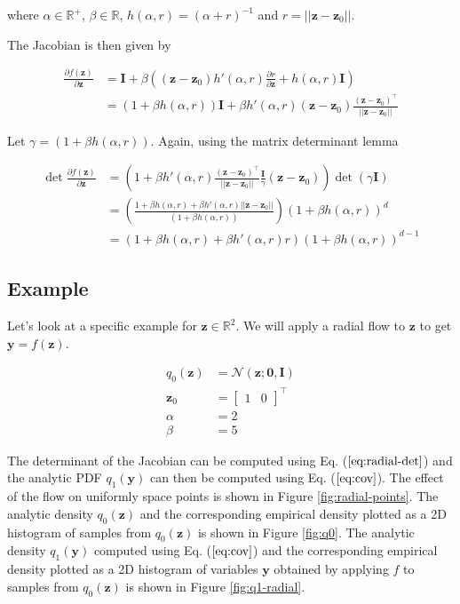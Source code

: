 \documentclass[]{article}
\begin{document}
where $\alpha \in \mathbb{R}^+$, $\beta \in \mathbb{R}$, $h(\alpha,r) = (\alpha + r)^{-1}$ and $r = \vert\vert\mathbf{z} - \mathbf{z}_0\vert\vert$.

The Jacobian is then given by

\begin{align*}
\frac{\partial f(\mathbf{z})}{\partial \mathbf{z}} &= \mathbf{I} + \beta\left((\mathbf{z}-\mathbf{z}_0)h'(\alpha,r)\frac{\partial r}{\partial \mathbf{z}} + h(\alpha,r)\mathbf{I}\right)\\
&=(1+\beta h(\alpha,r))\mathbf{I} + \beta h'(\alpha,r)(\mathbf{z}-\mathbf{z}_0)\frac{(\mathbf{z}-\mathbf{z}_0)^\top}{||\mathbf{z}-\mathbf{z}_0||}
\end{align*}


Let $\gamma = (1+\beta h(\alpha,r))$. Again, using the matrix determinant lemma

\begin{align}
\det\frac{\partial f(\mathbf{z})}{\partial \mathbf{z}} &= \left(1 + \beta h'(\alpha,r)\frac{(\mathbf{z}-\mathbf{z}_0)^\top}{||\mathbf{z}-\mathbf{z}_0||}\frac{\mathbf{I}}{\gamma}(\mathbf{z}-\mathbf{z}_0)\right)\det(\gamma\mathbf{I})\\
&=\left(\frac{1 + \beta h(\alpha,r) + \beta h'(\alpha,r)||\mathbf{z}-\mathbf{z}_0||}{(1+\beta h(\alpha,r))}\right)(1+\beta h(\alpha,r))^d\\
&=\left(1 + \beta h(\alpha,r) + \beta h'(\alpha,r)r\right)(1+\beta h(\alpha,r))^{d-1}\label{eq:radial-det}
\end{align}

\subsection{Example}

Let's look at a specific example for $\mathbf{z}\in\mathbb{R}^2$. We will apply a radial flow to $\mathbf{z}$ to get $\mathbf{y} = f(\mathbf{z})$.


\begin{align}
q_0(\mathbf{z}) &= \mathcal{N}(\mathbf{z};\mathbf{0},\mathbf{I})\\
\mathbf{z}_0 &= \begin{bmatrix}1 & 0\end{bmatrix}^\top\\
\alpha &= 2\\
\beta &= 5
\end{align}

The determinant of the Jacobian can be computed using Eq. ($\ref{eq:radial-det}$) and the analytic PDF $q_1(\mathbf{y})$ can then be computed using Eq. ($\ref{eq:cov}$).  The effect of the flow on uniformly space points is shown in Figure \ref{fig:radial-points}. The analytic density $q_0(\mathbf{z})$ and the corresponding empirical density plotted as a 2D histogram of samples from $q_0(\mathbf{z})$ is shown in Figure \ref{fig:q0}. The analytic density $q_1(\mathbf{y})$ computed using Eq. ($\ref{eq:cov}$) and the corresponding empirical density plotted as a 2D histogram of variables $\mathbf{y}$ obtained by applying $f$ to samples from $q_0(\mathbf{z})$ is shown in Figure \ref{fig:q1-radial}.
\end{document}
